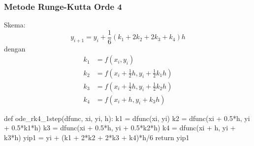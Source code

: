 \begin{frame}[fragile]
\frametitle{Metode Runge-Kutta Orde 4}
\fontsize{9pt}{8.0}\selectfont

Skema:
\begin{equation*}
y_{i+1} = y_{i} + \frac{1}{6}(k_1 + 2k_2 + 2k_3 + k_4) h
\end{equation*}
dengan
\begin{align*}
k_1 & = f(x_i, y_i) \\
k_2 & = f\left( x_i + \frac{1}{2}h, y_i + \frac{1}{2} k_1 h \right) \\
k_3 & = f\left( x_i + \frac{1}{2}h, y_i + \frac{1}{2} k_2 h \right) \\
k_4 & = f(x_i + h, y_i + k_3 h)
\end{align*}

\begin{pythoncode}
def ode_rk4_1step(dfunc, xi, yi, h):
    k1 = dfunc(xi, yi)
    k2 = dfunc(xi + 0.5*h, yi + 0.5*k1*h)
    k3 = dfunc(xi + 0.5*h, yi + 0.5*k2*h)
    k4 = dfunc(xi + h, yi + k3*h)
    yip1 = yi + (k1 + 2*k2 + 2*k3 + k4)*h/6
    return yip1
\end{pythoncode}

\end{frame}
